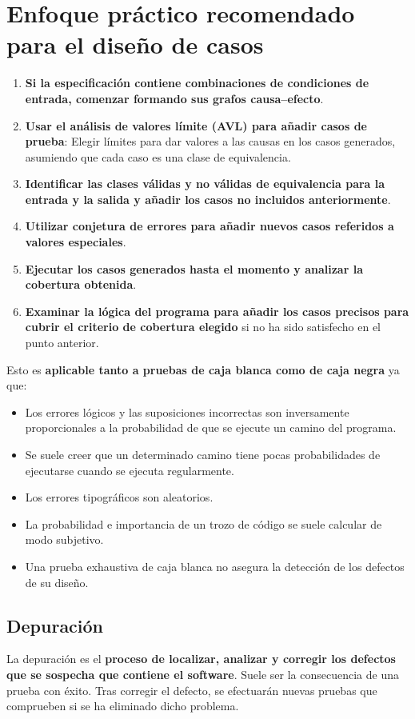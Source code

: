 \section{Enfoque práctico recomendado para el diseño de casos}

\begin{enumerate}
    \item \textbf{Si la especificación contiene combinaciones de condiciones de entrada, comenzar formando sus grafos causa--efecto}.
    \item \textbf{Usar el análisis de valores límite (AVL) para añadir casos de prueba}: Elegir límites para dar valores a las causas en los casos generados, asumiendo que cada caso es una clase de equivalencia.
    \item \textbf{Identificar las clases válidas y no válidas de equivalencia para la entrada y la salida y añadir los casos no incluidos anteriormente}.
    \item \textbf{Utilizar conjetura de errores para añadir nuevos casos referidos a valores especiales}.
    \item \textbf{Ejecutar los casos generados hasta el momento y analizar la cobertura obtenida}.
    \item \textbf{Examinar la lógica del programa para añadir los casos precisos para cubrir el criterio de cobertura elegido} si no ha sido satisfecho en el punto anterior.
\end{enumerate}

Esto es \textbf{aplicable tanto a pruebas de caja blanca como de caja negra} ya que:
\begin{itemize}
    \item Los errores lógicos y las suposiciones incorrectas son inversamente proporcionales a la probabilidad de que se ejecute un camino del programa.
    \item Se suele creer que un determinado camino tiene pocas probabilidades de ejecutarse cuando se ejecuta regularmente.
    \item Los errores tipográficos son aleatorios.
    \item La probabilidad e importancia de un trozo de código se suele calcular de modo subjetivo.
    \item Una prueba exhaustiva de caja blanca no asegura la detección de los defectos de su diseño.
\end{itemize}



\subsection{Depuración}
La depuración es el \textbf{proceso de localizar, analizar y corregir los defectos que se sospecha que contiene el software}. Suele ser la consecuencia de una prueba con éxito. Tras corregir el defecto, se efectuarán nuevas pruebas que comprueben si se ha eliminado dicho problema.

